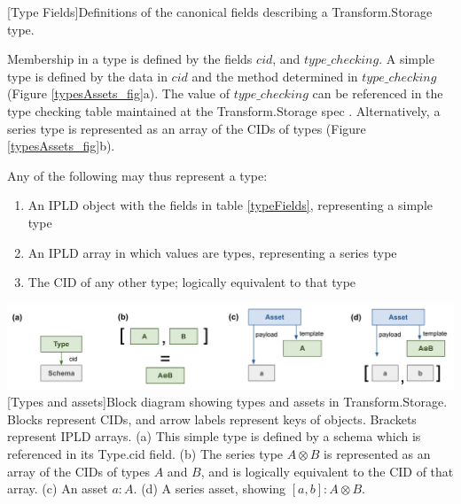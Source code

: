 \documentclass[9pt, oneside]{article}   	%
\begin{document}
\begin{multicols}{2}
[Type Fields]{Definitions of the canonical fields describing a Transform.Storage type.}
\label{typeFields}
\setlength{\parindent}{.5 cm}
\vspace{.25 cm}

Membership in a type is defined by the fields $cid$, and $type\_checking$. A simple type is defined by the data in $cid$ and the method determined in $type\_checking$ (Figure \ref{typesAssets_fig}a). The value of $type\_checking$ can be referenced in the type checking table maintained at the Transform.Storage spec \cite{transformSpec}. Alternatively, a series type is represented as an array of the CIDs of types (Figure \ref{typesAssets_fig}b). 

Any of the following may thus represent a type:
\begin{enumerate}
\item An IPLD object with the fields in table \ref{typeFields}, representing a simple type
\item An IPLD array in which values are types, representing a series type
\item The CID of any other type; logically equivalent to that type
\end{enumerate}

\end{multicols}
\begin{center}
\includegraphics[width=1\columnwidth]{fig_types_assets_20230802}
[Types and assets]{Block diagram showing types and assets in Transform.Storage. Blocks represent CIDs, and arrow labels represent keys of objects. Brackets represent IPLD arrays. (a) This simple type is defined by a schema which is referenced in its Type.cid field. (b) The series type $A \otimes B$ is represented as an array of the CIDs of types $A$ and $B$, and is logically equivalent to the CID of that array. (c) An asset $a : A$. (d) A series asset, showing $[a, b] : A \otimes B$.}
\label{typesAssets_fig}
\end{center}
\end{document}
